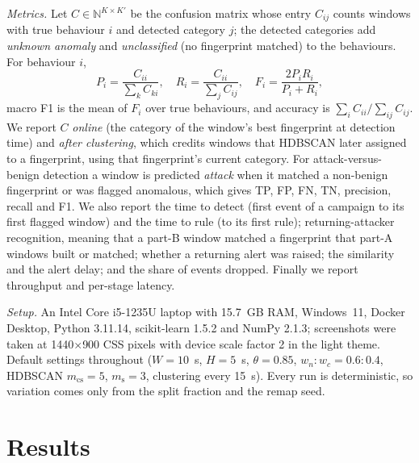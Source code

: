 \documentclass[conference]{IEEEtran}
\begin{document}
\textit{Metrics.} Let $C\in\mathbb N^{K\times K'}$ be the confusion matrix whose entry $C_{ij}$ counts windows with true behaviour $i$ and detected category $j$; the detected categories add \emph{unknown anomaly} and \emph{unclassified} (no fingerprint matched) to the behaviours. For behaviour $i$,
\begin{equation}
P_i=\frac{C_{ii}}{\sum_k C_{ki}},\quad R_i=\frac{C_{ii}}{\sum_j C_{ij}},\quad F_i=\frac{2P_iR_i}{P_i+R_i},
\end{equation}
macro F1 is the mean of $F_i$ over true behaviours, and accuracy is $\sum_i C_{ii}/\sum_{ij}C_{ij}$. We report $C$ \emph{online} (the category of the window's best fingerprint at detection time) and \emph{after clustering}, which credits windows that HDBSCAN later assigned to a fingerprint, using that fingerprint's current category. For attack-versus-benign detection a window is predicted \emph{attack} when it matched a non-benign fingerprint or was flagged anomalous, which gives TP, FP, FN, TN, precision, recall and F1. We also report the time to detect (first event of a campaign to its first flagged window) and the time to rule (to its first rule); returning-attacker recognition, meaning that a part-B window matched a fingerprint that part-A windows built or matched; whether a returning alert was raised; the similarity and the alert delay; and the share of events dropped. Finally we report throughput and per-stage latency.

\textit{Setup.} An Intel Core i5-1235U laptop with 15.7~GB RAM, Windows~11, Docker Desktop, Python 3.11.14, scikit-learn 1.5.2 and NumPy 2.1.3; screenshots were taken at 1440$\times$900 CSS pixels with device scale factor 2 in the light theme. Default settings throughout ($W=10$~s, $H=5$~s, $\theta=0.85$, $w_n{:}w_c=0.6{:}0.4$, HDBSCAN $m_{\mathrm{cs}}=5$, $m_{\mathrm{s}}=3$, clustering every 15~s). Every run is deterministic, so variation comes only from the split fraction and the remap seed.

\section{Results}\label{sec:results}
\end{document}
